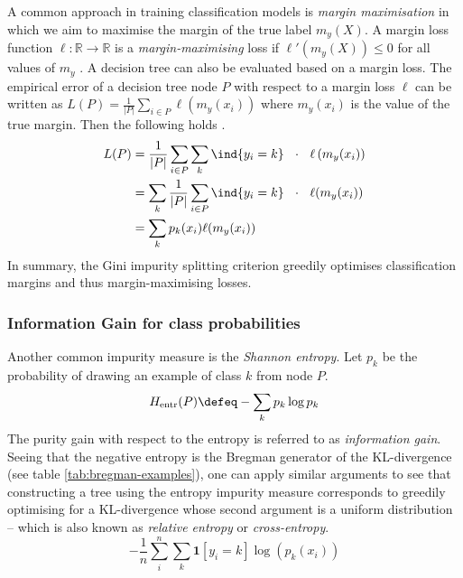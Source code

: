 \documentclass[../main.tex]{subfiles}
\begin{document}
A common approach in training classification models
is \textit{margin maximisation} \cite{schapire_BoostingFoundationsAlgorithms_2012}
in which we aim to maximise the margin of the true label $m_{y}(X)$. 
A margin loss function $\ell : \mathbb{R} \to \mathbb{R}$ is a \textit{margin-maximising} loss if $\ell'(m_{y}(X)) \leq 0$ for all values of $m_{y}$ \cite{leistner_SemiSupervisedRandomForests_2009}.
%
A decision tree can also be evaluated based on a margin loss.
The empirical error of a decision tree node $P$ with respect to a margin loss $\ell$ can be written as $L(P) = \frac{1}{|P|} \sum_{i \in P} \ell\left(m_{y}(x_{i})\right)$ where $m_{y}(x_{i})$ is the value of the true margin. Then the following holds \cite{leistner_SemiSupervisedRandomForests_2009}.
\begin{align*}
L(P) &= \frac{1}{|P|}\sum_{i \in P} \sum_{k} \ind{y_{i}=k} ~ ~ \cdot ~ ~  \ell   \left( m_y(x_i) \right)  \\
&= \sum_{k}  
\frac{1}{|P|} \sum_{i \in P} \ind{y_{i}=k}
~ ~ \cdot ~ ~ 
\ell(m_{y}(x_{i})) \\
&= \sum_k p_k(x_i) \ell(m_y(x_i))
\end{align*}
In summary, the Gini impurity splitting criterion greedily optimises classification margins and thus margin-maximising losses.

\subsubsection{Information Gain for class probabilities}

Another common impurity measure is the \textit{Shannon entropy}. Let $p_{k}$ be the probability of drawing an example of class $k$ from node $P$.
$$
H_{\text{entr}}(P) \defeq -\sum_{k} p_{k} \log p_{k}
$$
The purity gain with respect to the entropy is referred to as \textit{information gain}.
Seeing that the negative entropy is the Bregman generator of the KL-divergence (see table \ref{tab:bregman-examples}), one can apply similar arguments to see that constructing a tree using the entropy impurity measure corresponds to greedily optimising for a KL-divergence whose second argument is a uniform distribution -- which is also known as \textit{relative entropy} or \textit{cross-entropy}.
$$
- \frac{1}{n} \sum_{i}^n \sum_k \mathbf{1}\left[y_i=k\right] \log(p_k(x_i))
$$
\end{document}
